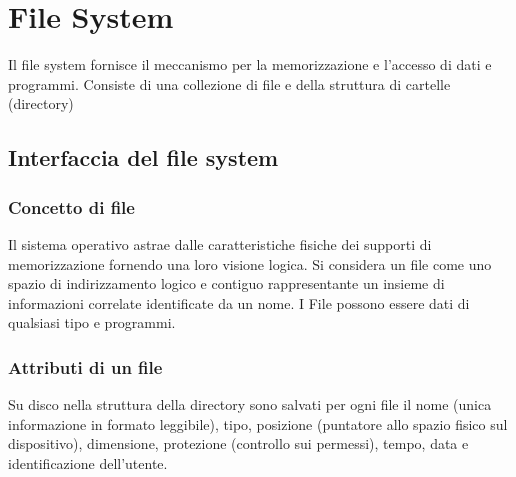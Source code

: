 \chapter{File System}
Il file system fornisce il meccanismo per la memorizzazione e l'accesso di dati e programmi. Consiste di una collezione di file e della struttura di cartelle (directory)
\section{Interfaccia del file system}
\subsection{Concetto di file}
Il sistema operativo astrae dalle caratteristiche fisiche dei supporti di memorizzazione fornendo una loro visione logica. Si considera un file come uno spazio di indirizzamento logico 
e contiguo rappresentante un insieme di informazioni correlate identificate da un nome. I File possono essere dati di qualsiasi tipo e programmi. 
\subsection{Attributi di un file}
Su disco nella struttura della directory sono salvati per ogni file il nome (unica informazione in formato leggibile), tipo, posizione (puntatore allo spazio fisico sul dispositivo), 
dimensione, protezione (controllo sui permessi), tempo, data e identificazione dell'utente. 
